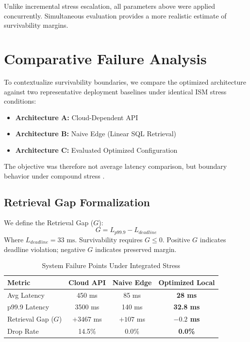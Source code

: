 \documentclass[conference]{IEEEtran}
\begin{document}
Unlike incremental stress escalation, all parameters above were applied concurrently. Simultaneous evaluation provides a more realistic estimate of survivability margins.

\section{Comparative Failure Analysis}

To contextualize survivability boundaries, we compare the optimized architecture against two representative deployment baselines under identical ISM stress conditions:
\begin{itemize}
    \item \textbf{Architecture A:} Cloud-Dependent API
    \item \textbf{Architecture B:} Naive Edge (Linear SQL Retrieval)
    \item \textbf{Architecture C:} Evaluated Optimized Configuration
\end{itemize}
The objective was therefore not average latency comparison, but boundary behavior under compound stress \cite{b10, b31}.

\subsection{Retrieval Gap Formalization}
We define the Retrieval Gap ($G$):
\begin{equation}
G = L_{p99.9} - L_{deadline}
\end{equation}
Where $L_{deadline} = 33\text{ ms}$. Survivability requires $G \le 0$. Positive $G$ indicates deadline violation; negative $G$ indicates preserved margin.

\begin{table}[htbp]
\caption{System Failure Points Under Integrated Stress}
\begin{center}
\begin{tabular}{lccc}
\toprule
\textbf{Metric} & \textbf{Cloud API} & \textbf{Naive Edge} & \textbf{Optimized Local} \\
\midrule
Avg Latency & 450 ms & 85 ms & \textbf{28 ms} \\
p99.9 Latency & 3500 ms & 140 ms & \textbf{32.8 ms} \\
Retrieval Gap ($G$) & $+3467$ ms & $+107$ ms & \textbf{$-0.2$ ms} \\
Drop Rate & 14.5\% & 0.0\% & \textbf{0.0\%} \\
\bottomrule
\end{tabular}
\end{center}
\label{tab:failure}
\end{table}
\end{document}
